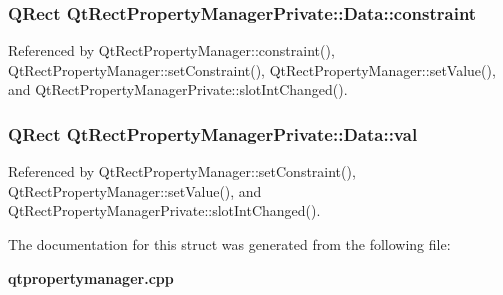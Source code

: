 \subsubsection[{constraint}]{\setlength{\rightskip}{0pt plus 5cm}Q\+Rect Qt\+Rect\+Property\+Manager\+Private\+::\+Data\+::constraint}\label{structQtRectPropertyManagerPrivate_1_1Data_afb4a330de5b2be8a2ba9ec14bfe08019}


Referenced by Qt\+Rect\+Property\+Manager\+::constraint(), Qt\+Rect\+Property\+Manager\+::set\+Constraint(), Qt\+Rect\+Property\+Manager\+::set\+Value(), and Qt\+Rect\+Property\+Manager\+Private\+::slot\+Int\+Changed().

\subsubsection[{val}]{\setlength{\rightskip}{0pt plus 5cm}Q\+Rect Qt\+Rect\+Property\+Manager\+Private\+::\+Data\+::val}\label{structQtRectPropertyManagerPrivate_1_1Data_a1bab9742548946cc5b6fee65c2e3a376}


Referenced by Qt\+Rect\+Property\+Manager\+::set\+Constraint(), Qt\+Rect\+Property\+Manager\+::set\+Value(), and Qt\+Rect\+Property\+Manager\+Private\+::slot\+Int\+Changed().



The documentation for this struct was generated from the following file\+:\begin{DoxyCompactItemize}
\item 
{\bf qtpropertymanager.\+cpp}\end{DoxyCompactItemize}
